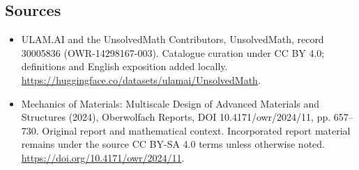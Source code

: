 \documentclass[11pt]{article}
\begin{document}
\subsection{Sources}
\begin{itemize}
\item[\hypertarget{source:30005836:1}{S1}] ULAM.AI and the UnsolvedMath Contributors, UnsolvedMath, record 30005836 (OWR-14298167-003). Catalogue curation under CC BY 4.0; definitions and English exposition added locally.
\url{https://huggingface.co/datasets/ulamai/UnsolvedMath}.
\item[\hypertarget{source:30005836:2}{S2}] Mechanics of Materials: Multiscale Design of Advanced Materials and Structures (2024), Oberwolfach Reports, DOI 10.4171/owr/2024/11, pp. 657--730. Original report and mathematical context. Incorporated report material remains under the source CC BY-SA 4.0 terms unless otherwise noted.
\url{https://doi.org/10.4171/owr/2024/11}.
\end{itemize}
\label{end:30005836}
\end{document}
